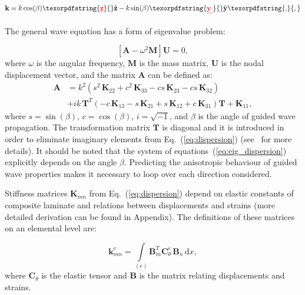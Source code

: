 \documentclass[preprint,12pt]{elsarticle}
\newcommand{\matr}[1]{\mathbf{#1}} %
\newcommand{\vect}[1]{\mathbf{#1}} %
\newcommand{\ud}{\mathrm{d}}
\providecommand{\DIFaddtex}[1]{{\protect\color{blue}\uwave{#1}}} %
\providecommand{\DIFdeltex}[1]{{\protect\color{red}\sout{#1}}}                      %
\providecommand{\DIFaddbegin}{} %
\providecommand{\DIFaddend}{} %
\providecommand{\DIFdelbegin}{} %
\providecommand{\DIFdelend}{} %
\providecommand{\DIFadd}[1]{\texorpdfstring{\DIFaddtex{#1}}{#1}} %
\providecommand{\DIFdel}[1]{\texorpdfstring{\DIFdeltex{#1}}{}} %
\begin{document}
	\begin{equation}
	  \vect{k} = k \cos (\beta)\DIFdelbegin \DIFdel{\vect{z} }\DIFdelend \DIFaddbegin \hat{ \vect{z}} \DIFaddend - k \sin (\beta) \DIFdelbegin \DIFdel{\vect{y}.
		}\DIFdelend \DIFaddbegin \hat{\vect{y}}\DIFadd{,
		}\DIFaddend \label{eq:wavevector}
	\end{equation}
	\DIFdelbegin %

\DIFdelend \DIFaddbegin \DIFadd{where $\hat{ \vect{z}} $ and $\hat{\vect{y}}$ are unit vectors. }\DIFaddend The general wave equation has a form of eigenvalue problem:

	\begin{equation}
	\left[\matr{A} - \omega^2\matr{M} \right] \vect{U} =0,
	\label{eq:eig_dispersion}
	\end{equation}
	where $\omega$ is the angular frequency, $\matr{M}$ is the mass matrix, $\matr{U}$ is the nodal displacement vector, and the matrix $\matr{A}$ can be defined as:
	\begin{equation}
	\begin{aligned}
	\matr{A} & =  k^2\left(s^2 \,\matr{K}_{22} + c^2\, \matr{K}_{33} - c s\, \matr{K}_{23} - c s\, \matr{K}_{32}\right) \\
	& + i k\, \matr{T}^T\left(-c\, \matr{K}_{13} - s\, \matr{K}_{21} + s\, \matr{K}_{12} + c\, \matr{K}_{31}\right) \matr{T} +\matr{K}_{11},
	\end{aligned}
	\label{eq:dispersion}
	\end{equation}
	where  $s = \sin(\beta)$, $c = \cos(\beta)$, $i = \sqrt{-1}$, and $\beta$ is the angle of guided wave propagation. The transformation matrix $\matr{T}$ is diagonal and it is introduced in order to eliminate imaginary elements from Eq.~(\ref{eq:dispersion}) (see~\cite{Bartoli2006} for more details). It should be noted that the system of equations~(\ref{eq:eig_dispersion}) explicitly depends on the angle $\beta$. Predicting the anisotropic behaviour of guided wave properties makes it necessary to loop over each direction considered.

	Stiffness matrices $\matr{K}_{mn}$ from Eq.~(\ref{eq:dispersion}) depend on elastic constants of composite laminate and relations between displacements and strains (more detailed derivation can be found in Appendix). The definitions of these matrices on an elemental level are:

	\begin{equation}
	\matr{k}_{mn}^e= \int \limits_{(e)} \matr{B}_m^{T} \matr{C}_{\theta}^e \, \matr{B}_n\, \ud x, 
	\label{eq:stiffness_matrix_e}
	\end{equation}
	where $\matr{C}_{\theta}$ is the elastic tensor and $\matr{B}$ is the matrix relating displacements and strains.
\end{document}
